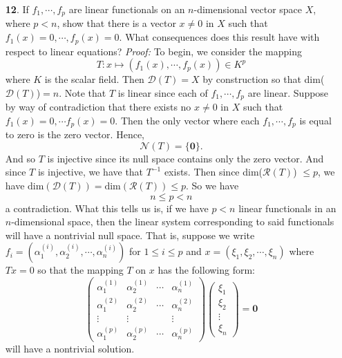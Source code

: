 \documentclass{article}
\begin{document}
\begin{itemize}
    \item[\textbf{12}.] If $f_1, \cdots, f_p$ are linear functionals on an $n$-dimensional vector space $X$, where $p < n$, show that there is a vector $x \neq 0$ in $X$ such that $f_1(x) = 0, \cdots, f_p(x) = 0$. What consequences does this result have with respect to linear equations?
    \newline\newline
    \textit{Proof:} To begin, we consider the mapping 
    \[T: x \mapsto (f_1(x), \cdots, f_p(x)) \in K^p\]
    where $K$ is the scalar field. Then $\mathcal{D}(T) = X$ by construction so that dim($\mathcal{D}(T)$)$ = n$. Note that $T$ is linear since each of $f_1, \cdots, f_p$ are linear. Suppose by way of contradiction that there exists no $x \neq 0$ in $X$ such that $f_1(x) = 0, \cdots f_p(x) = 0$. Then the only vector where each $f_1,\cdots, f_p$ is equal to zero is the zero vector. Hence,
    \[\mathcal{N}(T) = \{\mathbf{0}\}.\]
    And so $T$ is injective since its null space contains only the zero vector. And since $T$ is injective, we have that $T^{-1}$ exists. Then since dim($\mathcal{R}(T)$) $ \leq p$, we have $\text{dim}(\mathcal{D}(T)) = \text{dim}(\mathcal{R}(T)) \leq p$. So we have
    \[n \leq p < n\]
    a contradiction. 
    \newline\newline
    What this tells us is, if we have $p < n$ linear functionals in an $n$-dimensional space, then the linear system corresponding to said functionals will have a nontrivial null space. That is, suppose we write $f_i = (\alpha_1^{(i)}, \alpha_2^{(i)}, \cdots, \alpha_n^{(i)})$ for $1 \leq i \leq p$ and $x = (\xi_1, \xi_2, \cdots, \xi_n)$ where $Tx = 0$ so that the mapping $T$ on $x$ has the following form:
    \[\begin{pmatrix}
        \alpha_1^{(1)} & \alpha_2^{(1)} & \cdots & \alpha_n^{(1)}\\
        \alpha_1^{(2)} & \alpha_2^{(2)} & \cdots & \alpha_n^{(2)}\\
        \vdots & \vdots & & \vdots\\
        \alpha_1^{(p)} & \alpha_2^{(p)} & \cdots & \alpha_n^{(p)}
    \end{pmatrix}\begin{pmatrix}
        \xi_1\\
        \xi_2\\
        \vdots\\
        \xi_n
    \end{pmatrix} = \mathbf{0}\]
    will have a nontrivial solution.
\end{itemize}
\end{document}
